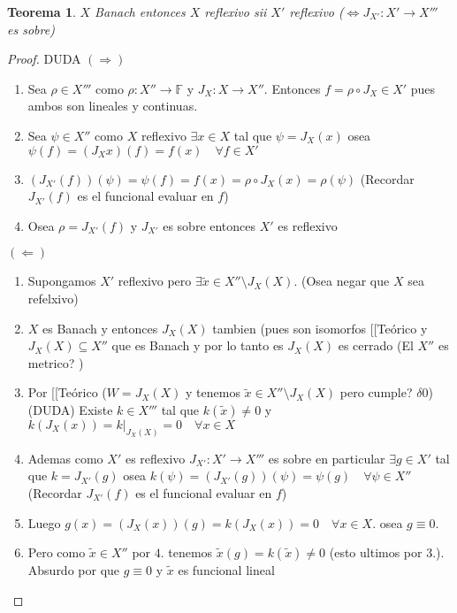 \documentclass[10pt]{extarticle}
\theoremstyle{break}
\newtheorem{theorem}{Teorema}[section]
\theoremstyle{definition}
\begin{document}
\begin{theorem}
$X$ Banach entonces $X$ reflexivo sii $X'$ reflexivo ($\iff J_{X'}:X'\rightarrow X'''$ es sobre)
\end{theorem}

\begin{proof} DUDA
$(\Rightarrow)$
\begin{enumerate}
	\item Sea $\rho\in X'''$ como $\rho :X''\rightarrow\mathbb{F}$ y $J_{X}:X\rightarrow X''$. Entonces $f=\rho \circ J_{X}\in X'$ pues ambos son lineales y continuas.
	\item Sea $\psi \in X''$ como $X$ reflexivo $\exists x\in X$ tal que $\psi=J_{X}(x)$ osea $\psi(f)=(J_{X}x)(f)=f(x)\quad\forall f\in X'$
	\item $(J_{X'}(f))(\psi)=\psi(f)=f(x)=\rho\circ J_{X}(x)=\rho(\psi)$ (Recordar $J_{X'}(f)$ es el funcional evaluar en $f$)
	\item Osea $\rho = J_{X'}(f)$ y $J_{X'}$ es sobre entonces $X'$ es reflexivo
\end{enumerate}
$(\Leftarrow)$
\begin{enumerate}
	\item Supongamos $X'$ reflexivo pero $\exists \tilde{x}\in X''\setminus J_{X}(X)$. (Osea negar que $X$ sea refelxivo)
	\item $X$ es Banach y entonces $J_{X}(X)$ tambien (pues son isomorfos [[Teórico y $J_{X}(X)\subseteq X''$ que es Banach y por lo tanto es $J_{X}(X)$ es cerrado (El $X''$ es metrico? )
	\item Por [[Teórico ($W=J_{X}(X)$ y tenemos $\tilde{x}\in X''\setminus J_{X}(X)$ pero cumple? $\delta 0$) (DUDA) Existe $k\in X'''$ tal que $k(\tilde{x})\neq 0$ y $k(J_{X}(x))=k|_{J_{X}(X)}=0 \quad\forall x\in X$
	\item Ademas como $X'$ es reflexivo $J_{X'}:X'\rightarrow X'''$ es sobre en particular $\exists g\in X'$ tal que $k=J_{X'}(g)$ osea $k(\psi)=(J_{X'}(g))(\psi)=\psi(g)\quad\forall \psi\in X''$ (Recordar $J_{X'}(f)$ es el funcional evaluar en $f$)
	\item Luego $g(x)=(J_{X}(x))(g)=k(J_{X}(x))=0\quad\forall x\in X$. osea $g\equiv 0$.
	\item Pero como $\tilde{x}\in X''$ por $4.$ tenemos $\tilde{x}(g)=k(\tilde{x})\neq 0$ (esto ultimos por $3.$). Absurdo por que $g\equiv 0$ y $\tilde{x}$ es funcional lineal
\end{enumerate}
\end{proof}
\end{document}
